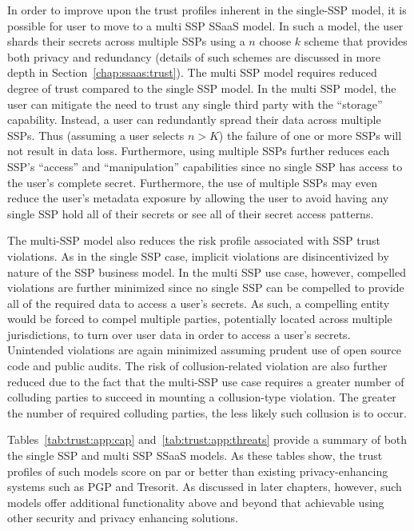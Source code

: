 In order to improve upon the trust profiles inherent in the single-SSP
model, it is possible for user to move to a multi SSP SSaaS model. In
such a model, the user shards their secrets across multiple SSPs using
a $n$ choose $k$ scheme that provides both privacy and redundancy
(details of such schemes are discussed in more depth in
Section~\ref{chap:ssaas:trust}). The multi SSP model requires reduced
degree of trust compared to the single SSP model. In the multi SSP
model, the user can mitigate the need to trust any single third party
with the ``storage'' capability. Instead, a user can redundantly
spread their data across multiple SSPs. Thus (assuming a user selects
$n > K$) the failure of one or more SSPs will not result in data
loss. Furthermore, using multiple SSPs further reduces each SSP's
``access'' and ``manipulation'' capabilities since no single SSP has
access to the user's complete secret. Furthermore, the use of multiple
SSPs may even reduce the user's metadata exposure by allowing the user
to avoid having any single SSP hold all of their secrets or see all of
their secret access patterns.

The multi-SSP model also reduces the risk profile associated with SSP
trust violations. As in the single SSP case, implicit violations are
disincentivized by nature of the SSP business model. In the multi SSP
use case, however, compelled violations are further minimized since no
single SSP can be compelled to provide all of the required data to
access a user's secrets. As such, a compelling entity would be forced
to compel multiple parties, potentially located across multiple
jurisdictions, to turn over user data in order to access a user's
secrets. Unintended violations are again minimized assuming prudent
use of open source code and public audits. The risk of
collusion-related violation are also further reduced due to the fact
that the multi-SSP use case requires a greater number of colluding
parties to succeed in mounting a collusion-type violation. The greater
the number of required colluding parties, the less likely such
collusion is to occur.

Tables~\ref{tab:trust:app:cap} and~\ref{tab:trust:app:threats} provide
a summary of both the single SSP and multi SSP SSaaS models. As these
tables show, the trust profiles of such models score on par or better
than existing privacy-enhancing systems such as PGP and Tresorit. As
discussed in later chapters, however, such models offer additional
functionality above and beyond that achievable using other security
and privacy enhancing solutions.

